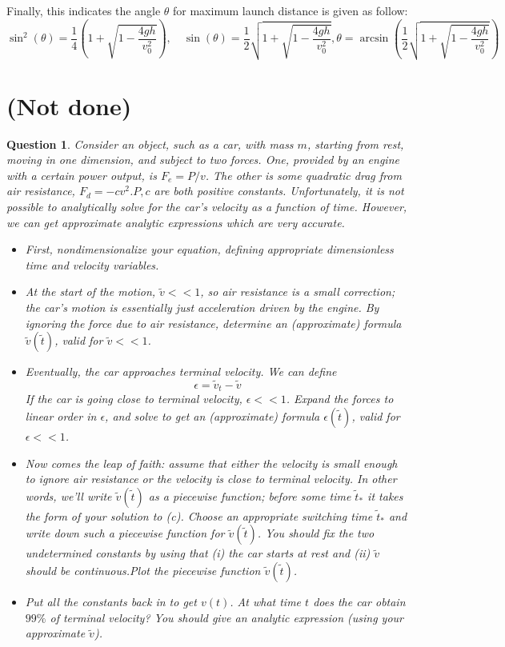 \documentclass{article}
\newtheorem{question}{Question}
\begin{document}
Finally, this indicates the angle $\theta$ for maximum launch distance is given as follow:
$$\sin^2(\theta)=\frac{1}{4}\left(1+\sqrt{1-\frac{4gh}{v_0^2}}\right),\quad \sin(\theta)=\frac{1}{2}\sqrt{1+\sqrt{1-\frac{4gh}{v_0^2}}}, \theta = \arcsin\left(\frac{1}{2}\sqrt{1+\sqrt{1-\frac{4gh}{v_0^2}}}\right)$$

\break

\section{(Not done)}%
\begin{question}\label{q3}
    Consider an object, such as a car, with mass $m$, starting from rest, moving in one dimension, and subject to two forces. One, provided by an engine with a certain power output, is $F_e = P/v$. The other is some quadratic drag from air resistance, $F_d = -cv^2$.$P,c$ are both positive constants. Unfortunately, it is not possible to analytically solve for the car's velocity as a function of time. However, we can get approximate analytic expressions which are very accurate.
    \begin{itemize}
        \item[(a)] First, nondimensionalize your equation, defining appropriate dimensionless time and velocity variables.
        \item[(b)] At the start of the motion, $\tilde{v}<< 1$, so air resistance is a small correction; the car's motion is essentially just acceleration driven by the engine. By ignoring the force due to air resistance, determine an (approximate) formula $\tilde{v}(\tilde{t})$, valid for $\tilde{v}<<1$.
        \item[(c)]Eventually, the car approaches terminal velocity. We can define 
        $$\epsilon = \tilde{v}_t-\tilde{v}$$
        If the car is going close to terminal velocity, $\epsilon <<1$. Expand the forces to linear order in $\epsilon$, and solve to get an (approximate) formula $\epsilon(\tilde{t})$, valid for $\epsilon<<1$.
        \item[(d)] Now comes the leap of faith: assume that either the velocity is small enough to ignore air resistance or the velocity is close to terminal velocity. In other words, we'll write $\tilde{v}(\tilde{t})$ as a piecewise function; before some time $\tilde{t}_*$ it takes the form of your solution to (c). Choose an appropriate switching time $\tilde{t}_*$ and write down such a piecewise function for $\tilde{v}(\tilde{t})$. You should fix the two undetermined constants by using that (i) the car starts at rest and (ii) $\tilde{v}$ should be continuous.Plot the piecewise function $\tilde{v}(\tilde{t})$.
        \item[(e)] Put all the constants back in to get $v(t)$. At what time $t$ does the car obtain $99\%$ of terminal velocity? You should give an analytic expression (using your approximate $\tilde{v}$). 
    \end{itemize}
\end{question}
\end{document}
